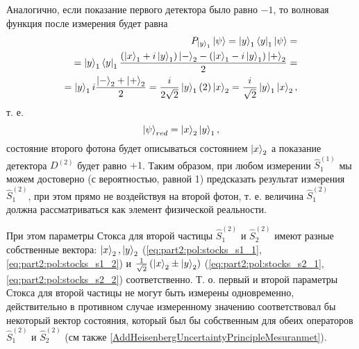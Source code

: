 Аналогично, если показание первого детектора было равно $-1$, то
волновая функция после измерения будет равна
\begin{eqnarray}
  P_{\ket{y}_1}\left|\psi\right> =
  \ket{y}_1\bra{y}_1 \left|\psi\right> =
  \nonumber \\
  =
  \ket{y}_1\bra{y}_1
  \frac{
    \left( \ket{x}_1 + i \ket{y}_1 \right)\ket{ - }_2 -
    \left( \ket{x}_1 - i \ket{y}_1 \right)\ket{ + }_2
  }{2} =
  \nonumber \\
  =
  \ket{y}_1 i 
  \frac{\ket{ - }_2 + \ket{ + }_2}{2} =
  \frac{i}{2\sqrt{2}}\ket{y}_1 \left(2\right)
  \ket{x}_2 =
  \frac{i}{\sqrt{2}}\ket{y}_1\ket{x}_2,
  \nonumber
\end{eqnarray}
т. е.
\[
\left|\psi\right>_{red} = \ket{x}_2\ket{y}_1,
\]
состояние второго фотона будет описываться состоянием
$\ket{x}_2$ а показание детектора $D^{(2)}$ будет равно $+1$.
Таким образом, при любом измерении $\hat{S}_1^{(1)}$ мы можем
достоверно (с вероятностью, равной 1) предсказать результат измерения
$\hat{S}_1^{(2)}$, при этом прямо не воздействуя на второй фотон, т. е.
величина $\hat{S}_1^{(2)}$ должна рассматриваться как элемент
физической реальности.

При этом параметры Стокса для второй частицы  $\hat{S}_1^{(2)}$ и
$\hat{S}_2^{(2)}$ имеют 
разные собственные вектора:
$\ket{x}_2, \ket{y}_2$ (\ref{eq:part2:pol:stocks_s1_1},
  \ref{eq:part2:pol:stocks_s1_2}) и
$\frac{1}{\sqrt{2}}\left(\ket{x}_2 \pm
\ket{y}_2\right)$ (\ref{eq:part2:pol:stocks_s2_1},
  \ref{eq:part2:pol:stocks_s2_2}) соответственно.
Т. о. первый и второй параметры Стокса для второй частицы не могут
быть измерены одновременно, действительно в противном случае
измеренному значению соответствовал бы  
некоторый вектор состояния, который был бы собственным для обеих
операторов $\hat{S}_1^{(2)}$ и
$\hat{S}_2^{(2)}$ (см также
\autoref{AddHeisenbergUncertaintyPrincipleMesuranmet}). 



